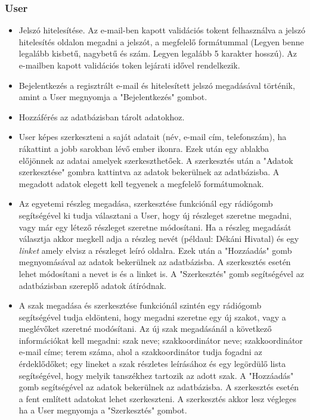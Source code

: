 \subsubsection{User}
\begin{itemize}
	\item Jelszó hitelesítése. Az e-mail-ben kapott validációs tokent felhasználva a jelszó hitelesítés oldalon megadni a jelszót, a megfelelő formátummal (Legyen benne legalább kisbetű, nagybetű és szám. Legyen legalább 5 karakter hosszú). Az e-mailben kapott validációs token lejárati idővel rendelkezik.
	\item Bejelentkezés a regisztrált e-mail és hitelesített jelszó megadásával történik, amint a User megnyomja a "Bejelentkezés" gombot.
	\item Hozzáférés az adatbázisban tárolt adatokhoz.
	\item User képes szerkeszteni a saját adatait (név, e-mail cím, telefonszám), ha rákattint a jobb sarokban lévő ember ikonra. Ezek után egy ablakba előjönnek az adatai amelyek szerkeszthetőek. A szerkesztés után a "Adatok szerkesztése" gombra kattintva az adatok bekerülnek az adatbázisba. A megadott adatok elegett kell tegyenek a megfelelő formátumoknak.
	\item Az egyetemi részleg megadása, szerkesztése funkciónál egy rádiógomb segítségével ki tudja választani a User, hogy új részleget szeretne megadni, vagy már egy létező részleget szeretne módosítani. Ha a részleg megadását választja akkor megkell adja a részleg nevét (példaul: Dékáni Hivatal) és egy {\textit{linket}\footnotemark} amely elvisz a részleget leíró oldalra. Ezek után a "Hozzáadás" gomb megnyomásával az adatok bekerülnek az adatbázisba. A szerkesztés esetén lehet módosítani a nevet is és a linket is. A "Szerkesztés" gomb segítségével az adatbázisban szereplő adatok átíródnak.
	\item A szak megadása és szerkesztése funkciónál szintén egy rádiógomb segítségével tudja eldönteni, hogy megadni szeretne egy új szakot, vagy a meglévőket szeretné modósítani. Az új szak megadásánál a következő információkat kell megadni: szak neve; szakkoordinátor neve; szakkoordinátor e-mail címe; terem száma, ahol a szakkoordinátor tudja fogadni az érdeklődőket; egy lineket a szak részletes leírásához és egy legördülő lista segítségével, hogy melyik tanszékhez tartozik az adott szak. A "Hozzáadás" gomb segítségével az adatok bekerülnek az adatbázisba. A szerkesztés esetén a fent említett adatokat lehet szerkeszteni. A szerkesztés akkor lesz végleges ha a User megnyomja a "Szerkesztés" gombot.

\end{itemize}

